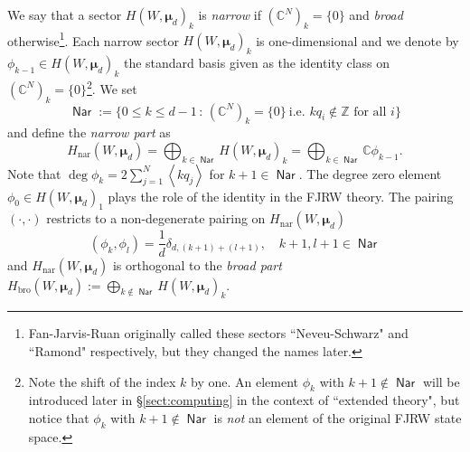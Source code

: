 \documentclass[11pt]{amsart}
\theoremstyle{definition} %
\theoremstyle{remark} %
\newcommand{\CC}{\mathbb C}
\newcommand{\ZZ}{\mathbb Z}
\newcommand{\nar}{\operatorname{nar}}
\def\fracp#1{\left\langle #1 \right\rangle}
\newcommand{\bmu}{\boldsymbol{\mu}}
\newcommand{\Nar}{\operatorname{\mathsf{Nar}}}
\newcommand{\bro}{\operatorname{bro}}
\begin{document}
We say that a sector $H(W,\bmu_d)_k$ is 
\emph{narrow}
if $(\CC^N)_k =\{0\}$ and 
\emph{broad} otherwise\footnote
{Fan-Jarvis-Ruan originally called these sectors 
``Neveu-Schwarz" and ``Ramond" respectively, but they 
changed the names later.}. 
Each narrow sector $H(W,\bmu_d)_k$ is one-dimensional 
and we denote by $\phi_{k-1}\in H(W,\bmu_d)_k$ 
the standard basis given as 
the identity class on $(\CC^N)_k=\{0\}$\footnote
{Note the shift of the index $k$ by one. An element $\phi_k$ with 
$k+1\notin \Nar$ will be introduced later in \S \ref{sect:computing} 
in the context of ``extended theory", 
but notice that $\phi_k$ with $k+1\notin \Nar$ 
is \emph{not} an element of the original FJRW state space.}. 
We set 
\[
\Nar := \{0\le k\le d-1\,:\, (\CC^N)_k =\{0\} \ 
\text{i.e.~$kq_i\notin \ZZ$ for all $i$}\}  
\]
and define the \emph{narrow part} as 
\[
H_{\nar}(W,\bmu_d) = \bigoplus_{k\in \Nar} H(W,\bmu_d)_k 
= \bigoplus_{k\in \Nar} \CC \phi_{k-1}. 
\]
Note that $\deg \phi_k = 2\sum_{j=1}^N \fracp{kq_j}$ for 
$k+1 \in \Nar$.  
The degree zero element $\phi_0 \in H(W,\bmu_d)_1$ plays the role of 
the identity in the FJRW theory. 
The pairing $(\cdot,\cdot)$ 
restricts to a non-degenerate pairing on $H_{\nar}(W,\bmu_d)$ 
\begin{equation} 
\label{eq:pairing_narrow} 
(\phi_k,\phi_l) = \frac{1}{d} \delta_{d, (k+1)+(l+1)}, \quad 
k+1, l+1 \in \Nar  
\end{equation} 
and $H_{\nar}(W,\bmu_d)$ is orthogonal to the  
\emph{broad part}
$H_{\bro}(W,\bmu_d):=\bigoplus_{k\notin \Nar} H(W,\bmu_d)_k$.   
\end{document}
